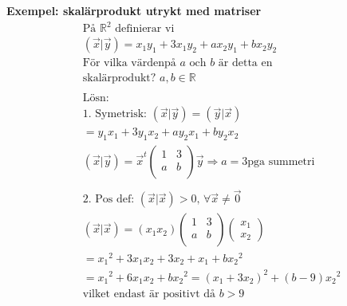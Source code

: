 \begin{multicols}{2}
\textbf{Exempel: skalärprodukt utrykt med matriser}
\begin{align*}
  &\text{På $\mathbb{R}^2$ definierar vi } \\
  &(\vec{x}|\vec{y}) = x_1y_1 + 3x_1y_2 + ax_2y_1 + bx_2y_2 \\
  &\text{För vilka värdenpå $a$ och $b$ är detta en} \\
  &\text{skalärprodukt? } a,b \in \mathbb{R} \\
  &\\
  &\text{Lösn: } \\
  &\text{1. Symetrisk:  }  (\vec{x}|\vec{y}) = (\vec{y}|\vec{x}) \\
  &= y_1x_1 + 3y_1x_2 + ay_2x_1 + by_2x_2 \\
  &(\vec{x}|\vec{y}) =
  \vec{x}^t
  \left(\begin{array}{cc}
    1 & 3 \\
    a & b \\
  \end{array}\right)
  \vec{y} \Rightarrow{a=3} \text{pga summetri} \\
  &\\
  &\text{2. Pos def:  }  (\vec{x}|\vec{x}) > 0, \, \forall{} \vec{x} \neq{\vec{0}}  \\
  &(\vec{x}|\vec{x}) = (x_1 x_2)
  \left(\begin{array}{cc}
    1 & 3 \\
    a & b \\
  \end{array}\right) \begin{pmatrix} x_1 \\ x_2 \end{pmatrix} \\
  &= {x_1}^2 + 3x_1x_2 + 3x_2+x_1 + b{x_2}^2 \\
  &= {x_1}^2 + 6x_1x_2 + b{x_2}^2 = {(x_1+3x_2)}^2 + (b-9){x_2}^2 \\
  &\text{vilket endast är positivt då } b>9 \\
\end{align*}



\end{multicols}
